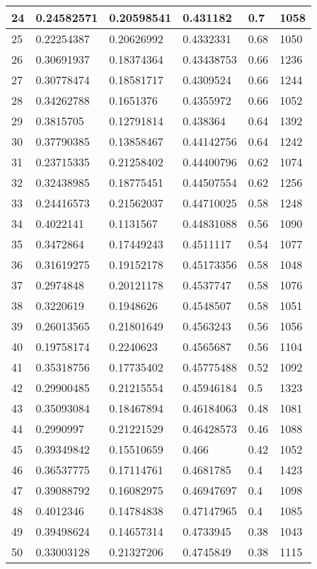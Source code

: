 \begin{longtable}{|l|l|l|l|l|l|}
24 & 0.24582571 & 0.20598541 & 0.431182 & 0.7 & 1058 \\ \hline 
25 & 0.22254387 & 0.20626992 & 0.4332331 & 0.68 & 1050 \\ \hline 
26 & 0.30691937 & 0.18374364 & 0.43438753 & 0.66 & 1236 \\ \hline 
27 & 0.30778474 & 0.18581717 & 0.4309524 & 0.66 & 1244 \\ \hline 
28 & 0.34262788 & 0.1651376 & 0.4355972 & 0.66 & 1052 \\ \hline 
29 & 0.3815705 & 0.12791814 & 0.438364 & 0.64 & 1392 \\ \hline 
30 & 0.37790385 & 0.13858467 & 0.44142756 & 0.64 & 1242 \\ \hline 
31 & 0.23715335 & 0.21258402 & 0.44400796 & 0.62 & 1074 \\ \hline 
32 & 0.32438985 & 0.18775451 & 0.44507554 & 0.62 & 1256 \\ \hline 
33 & 0.24416573 & 0.21562037 & 0.44710025 & 0.58 & 1248 \\ \hline 
34 & 0.4022141 & 0.1131567 & 0.44831088 & 0.56 & 1090 \\ \hline 
35 & 0.3472864 & 0.17449243 & 0.4511117 & 0.54 & 1077 \\ \hline 
36 & 0.31619275 & 0.19152178 & 0.45173356 & 0.58 & 1048 \\ \hline 
37 & 0.2974848 & 0.20121178 & 0.4537747 & 0.58 & 1076 \\ \hline 
38 & 0.3220619 & 0.1948626 & 0.4548507 & 0.58 & 1051 \\ \hline 
39 & 0.26013565 & 0.21801649 & 0.4563243 & 0.56 & 1056 \\ \hline 
40 & 0.19758174 & 0.2240623 & 0.4565687 & 0.56 & 1104 \\ \hline 
41 & 0.35318756 & 0.17735402 & 0.45775488 & 0.52 & 1092 \\ \hline 
42 & 0.29900485 & 0.21215554 & 0.45946184 & 0.5 & 1323 \\ \hline 
43 & 0.35093084 & 0.18467894 & 0.46184063 & 0.48 & 1081 \\ \hline 
44 & 0.2990997 & 0.21221529 & 0.46428573 & 0.46 & 1088 \\ \hline 
45 & 0.39349842 & 0.15510659 & 0.466 & 0.42 & 1052 \\ \hline 
46 & 0.36537775 & 0.17114761 & 0.4681785 & 0.4 & 1423 \\ \hline 
47 & 0.39088792 & 0.16082975 & 0.46947697 & 0.4 & 1098 \\ \hline 
48 & 0.4012346 & 0.14784838 & 0.47147965 & 0.4 & 1085 \\ \hline 
49 & 0.39498624 & 0.14657314 & 0.4733945 & 0.38 & 1043 \\ \hline 
50 & 0.33003128 & 0.21327206 & 0.4745849 & 0.38 & 1115 \\ \hline 
\end{longtable}